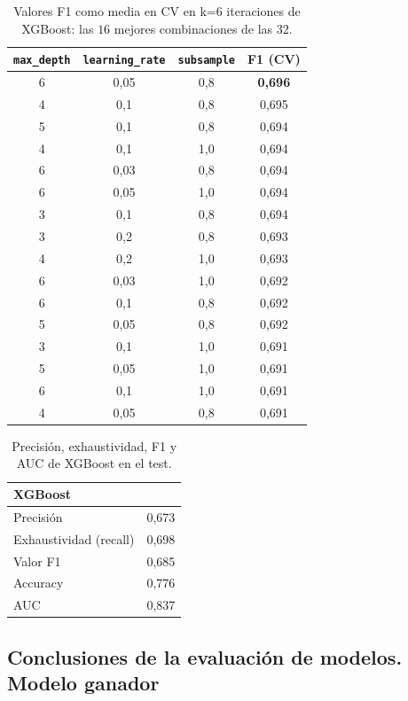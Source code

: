 \documentclass[12pt,a4paper]{report}
\theoremstyle{definition}
\newcommand{\tc}[1]{\texttt{#1}}
\begin{document}
\begin{table}[H]
\centering\footnotesize
\begin{tabular}{cccc}
\toprule
\tc{max\_depth} & \tc{learning\_rate} & \tc{subsample} & F1 (CV) \\
\midrule
6 & 0,05 & 0,8 & \textbf{0,696} \\
4 & 0,1 & 0,8 & 0,695 \\
5 & 0,1 & 0,8 & 0,694 \\
4 & 0,1 & 1,0 & 0,694 \\
6 & 0,03 & 0,8 & 0,694 \\
6 & 0,05 & 1,0 & 0,694 \\
3 & 0,1 & 0,8 & 0,694 \\
3 & 0,2 & 0,8 & 0,693 \\
4 & 0,2 & 1,0 & 0,693 \\
6 & 0,03 & 1,0 & 0,692 \\
6 & 0,1 & 0,8 & 0,692 \\
5 & 0,05 & 0,8 & 0,692 \\
3 & 0,1 & 1,0 & 0,691 \\
5 & 0,05 & 1,0 & 0,691 \\
6 & 0,1 & 1,0 & 0,691 \\
4 & 0,05 & 0,8 & 0,691 \\
\bottomrule
\end{tabular}
\caption{Valores F1 como media en CV en k=6 iteraciones de XGBoost: las $16$ mejores combinaciones de
las $32$.}
\label{tab:grid-xgb}
\end{table}

\begin{table}[H]
\centering\small
\begin{tabular}{lc}
\toprule
XGBoost & \\
\midrule
Precisión & 0,673 \\
Exhaustividad (recall) & 0,698 \\
Valor F1 & 0,685 \\
Accuracy & 0,776 \\
AUC & 0,837 \\
\bottomrule
\end{tabular}
\caption{Precisión, exhaustividad, F1 y AUC de XGBoost en el test.}
\label{tab:met-xgb}
\end{table}


\subsection{Conclusiones de la evaluación de modelos. Modelo ganador}
\label{sec:winner}
\end{document}
